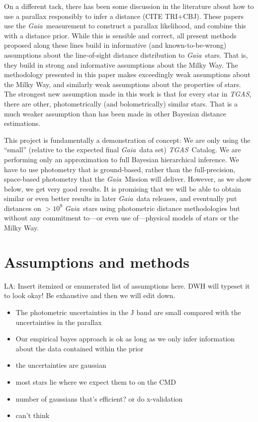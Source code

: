 \documentclass[12pt, preprint]{aastex6}
\newcommand{\acronym}[1]{{\small{#1}}}
\newcommand{\project}[1]{\textsl{#1}}
\newcommand{\tgas}{\project{\acronym{TGAS}}}
\newcommand{\gaia}{\project{Gaia}}
\begin{document}
On a different tack, there has been some discussion in the literature
about how to use a parallax responsibly to infer a distance (CITE TRI+CBJ).
These papers use the \gaia\ measurement to construct a parallax likelihood,
and combine this with a distance prior.
While this is sensible and correct, all present methods proposed along
these lines build in informative (and known-to-be-wrong) assumptions
about the line-of-sight distance distribution to \gaia\ stars.
That is, they build in strong and informative assumptions about the Milky
Way.
The methodology presented in this paper makes exceedingly weak assumptions
about the Milky Way, and similarly weak assumptions about the properties of
stars.
The strongest new assumption made in this work is that for every star
in \tgas, there are other, photometrically (and bolometrically)
similar stars.
That is a much weaker assumption than has been made in other Bayesian
distance estimations.

This project is fundamentally a demonstration of concept:
We are only using the ``small'' (relative to the expected final \gaia\ data set)
\tgas\ Catalog.
We are performing only an approximation to full Bayesian hierarchical inference.
We have to use photometry that is ground-based, rather than the full-precision,
space-based photometry that the \gaia\ Mission will deliver.
However, as we show below, we get very good results.
It is promising that we will be able to obtain similar or even better results
in later \gaia\ data releases, and eventually put distances on $>10^9$
\gaia\ stars using photometric distance methodologies but without any
commitment to---or even use of---physical models of stars or the Milky Way.

\section{Assumptions and methods}

LA: Insert itemized or enumerated list of assumptions here. DWH will
typeset it to look okay! Be exhaustive and then we will edit down.

\begin{itemize}
\item The photometric uncertainties in the J band are small compared with the uncertainties in the parallax
\item Our empirical bayes approach is ok as long as we only infer information about the data contained within the prior
\item the uncertainties are gaussian
\item most stars lie where we expect them to on the CMD
\item number of gaussians that's efficient? or do x-validation
\item can't think
\end{itemize}
\end{document}
